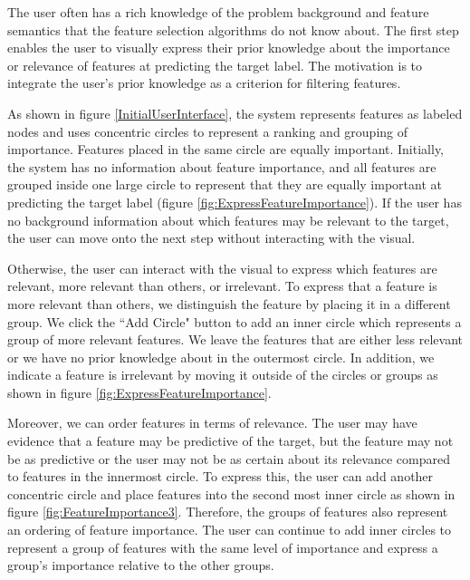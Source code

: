 The user often has a rich knowledge of the problem background and feature semantics that the feature selection algorithms do not know about. The first step enables the user to visually express their prior knowledge about the importance or relevance of features at predicting the target label. The motivation is to integrate the user's prior knowledge as a criterion for filtering features. 

As shown in figure \ref{InitialUserInterface}, the system represents features as labeled nodes and uses concentric circles to represent a ranking and grouping of importance. Features placed in the same circle are equally important. Initially, the system has no information about feature importance, and all features are grouped inside one large circle to represent that they are equally important at predicting the target label (figure \ref{fig:ExpressFeatureImportance}). If the user has no background information about which features may be relevant to the target, the user can move onto the next step without interacting with the visual. 

Otherwise, the user can interact with the visual to express which features are relevant, more relevant than others, or irrelevant. To express that a feature is more relevant than others, we distinguish the feature by placing it in a different group. We click the ``Add Circle" button to add an inner circle which represents a group of more relevant features. We leave the features that are either less relevant or we have no prior knowledge about in the outermost circle. In addition, we indicate a feature is irrelevant by moving it outside of the circles or groups as shown in figure \ref{fig:ExpressFeatureImportance}. 

Moreover, we can order features in terms of relevance. The user may have evidence that a feature may be predictive of the target, but the feature may not be as predictive or the user may not be as certain about its relevance compared to features in the innermost circle. To express this, the user can add another concentric circle and place features into the second most inner circle as shown in figure \ref{fig:FeatureImportance3}. Therefore, the groups of features also represent an ordering of feature importance. The user can continue to add inner circles to represent a group of features with the same level of importance and express a group's importance relative to the other groups. 

